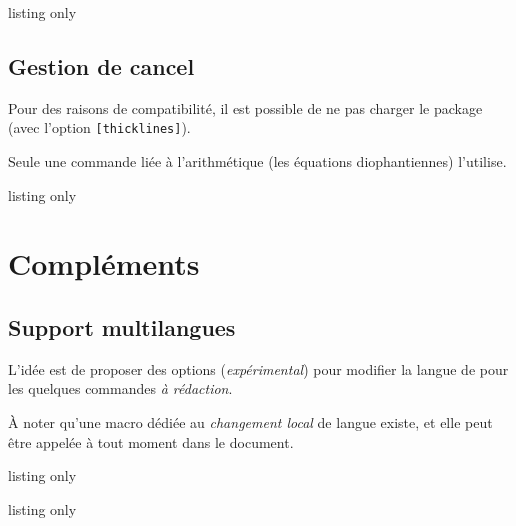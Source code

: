 \begin{PresCodeTexPL}{listing only}
\usepackage{ProfLycee}              %
\usepackage[nonfa]{ProfLycee}       %
\usepackage[fa6]{ProfLycee}         %
\usepackage[fa7]{ProfLycee}         %
\end{PresCodeTexPL}

\subsection{Gestion de cancel}

\begin{warningblock}
 Pour des raisons de compatibilité, il est possible de ne pas charger le package  (avec l'option \texttt{[thicklines]}).

Seule une commande liée à l'arithmétique (les équations diophantiennes) l'utilise.
\end{warningblock}

\begin{PresCodeTexPL}{listing only}
\usepackage[noncancel]{ProfLycee}
\end{PresCodeTexPL}

\section{Compléments}

\subsection{Support multilangues}\label{multilng}

\begin{tipblock}
L'idée est de proposer des options (\textit{expérimental}) pour modifier la langue de  pour les quelques commandes \textit{à rédaction}.

\smallskip

À noter qu'une macro dédiée au \textit{changement local} de langue existe, et elle peut être appelée à tout moment dans le document.
\end{tipblock}

\begin{PresCodeTexPL}{listing only}
\usepackage[french]{ProfLycee}    %
\usepackage[english]{ProfLycee}
\usepackage[german]{ProfLycee}
\usepackage[spanish]{ProfLycee}
\end{PresCodeTexPL}

\begin{PresCodeTexPL}{listing only}
\end{PresCodeTexPL}

